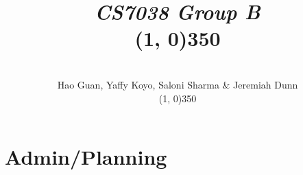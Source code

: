 \documentclass[12pt]{article}
\title{\textit{CS7038 Group B}\hspace{0.75cm}\\\line(1, 0){350}
}
\author
{\vspace{-1.2cm}\\Hao Guan, Yaffy Koyo, Saloni Sharma \& Jeremiah Dunn\\\line(1, 0){350}}
\date{}
\begin{document}
 

\maketitle 







\section{Admin/Planning}









\end{document}
